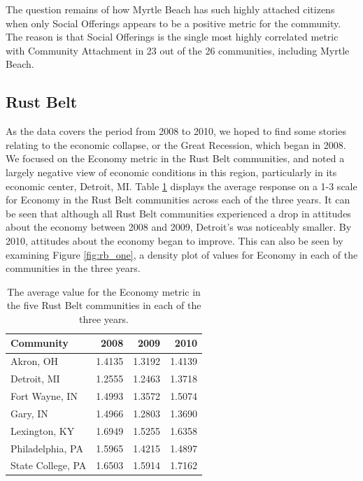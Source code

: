 \documentclass[11pt]{article}\usepackage{knitr}
\begin{document}
The question remains of how Myrtle Beach has such highly attached citizens when only Social Offerings appears to be a positive metric for the community. The reason is that Social Offerings is the single most highly correlated metric with Community Attachment in 23 out of the 26 communities, including Myrtle Beach.

\subsection{Rust Belt}
As the data covers the period from 2008 to 2010, we hoped to find some stories relating to the economic collapse, or the Great Recession, which began in 2008. We focused on the Economy metric in the Rust Belt communities, and noted a largely negative view of economic conditions in this region, particularly in its economic center, Detroit, MI. Table \ref{tbl:econ} displays the average response on a 1-3 scale for Economy in the Rust Belt communities across each of the three years. It can be seen that although all Rust Belt communities experienced a drop in attitudes about the economy between 2008 and 2009, Detroit's was noticeably smaller. By 2010, attitudes about the economy began to improve. This can also be seen by examining Figure \ref{fig:rb_one}, a density plot of values for Economy in each of the communities in the three years.

\begin{table}[ht]
\centering
\begin{tabular}{lrrr}
  \hline
Community & 2008 & 2009 & 2010 \\ 
  \hline
Akron, OH & 1.4135 & 1.3192 & 1.4139 \\ 
  Detroit, MI & 1.2555 & 1.2463 & 1.3718 \\ 
  Fort Wayne, IN & 1.4993 & 1.3572 & 1.5074 \\ 
  Gary, IN & 1.4966 & 1.2803 & 1.3690 \\ 
  Lexington, KY & 1.6949 & 1.5255 & 1.6358 \\ 
  Philadelphia, PA & 1.5965 & 1.4215 & 1.4897 \\ 
  State College, PA & 1.6503 & 1.5914 & 1.7162 \\ 
   \hline
\end{tabular}
\caption{The average value for the Economy metric in the five Rust Belt communities in each of the three years.} 
\label{tbl:econ}
\end{table}
\end{document}
